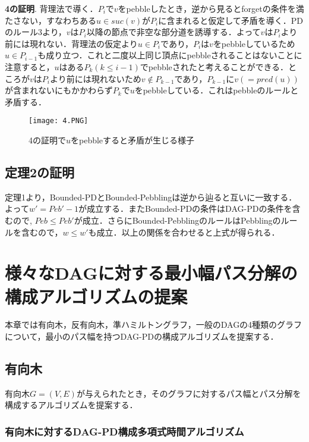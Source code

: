 \documentclass{kuisthesis}           %
\begin{document}
 \textbf{4の証明}.
 背理法で導く．$P_i$で$v$をpebbleしたとき，逆から見るとforgetの条件を満たさない，すなわちある$u \in suc(v)$が$P_i$に含まれると仮定して矛盾を導く．PDのルール3より，$v$は$P_i$以降の節点で非空な部分道を誘導する．よって$v$は$P_i$より前には現れない．背理法の仮定より$u \in P_i$であり，$P_i$は$v$をpebbleしているため$u \in P_{i-1}$も成り立つ．これと二度以上同じ頂点にpebbleされることはないことに注意すると，$u$はある$P_k (k \leq i-1)$でpebbleされたと考えることができる．ところが$v$は$P_i$より前には現れないため$v \notin P_{k-1}$であり，$P_{k-1}$に$v (= pred(u))$が含まれないにもかかわらず$P_k$で$u$をpebbleしている．これはpebbleのルールと矛盾する．

 
 \begin{figure}[tbh]
 \centering
 \texttt{[image: 4.PNG]}
 \caption{4の証明で$u$をpebbleすると矛盾が生じる様子}
 \label{fig:4}
 \end{figure}


 

 \subsection{定理2の証明}
 
 定理1より，Bounded-PDとBounded-Pebblingは逆から辿ると互いに一致する．よって$w'=Peb'-1$が成立する．またBounded-PDの条件はDAG-PDの条件を含むので, $Peb \leq Peb'$が成立．さらにBounded-PebblingのルールはPebblingのルールを含むので，$w \leq w'$も成立．以上の関係を合わせると上式が得られる．
 





\section{様々なDAGに対する最小幅パス分解の構成アルゴリズムの提案}\label{sec:advice}
本章では有向木，反有向木，準ハミルトングラフ，一般のDAGの4種類のグラフについて，最小のパス幅を持つDAG-PDの構成アルゴリズムを提案する．

 \subsection{有向木}
 有向木$G=(V, E)$が与えられたとき，そのグラフに対するパス幅とパス分解を構成するアルゴリズムを提案する．
 
 \subsubsection{有向木に対するDAG-PD構成多項式時間アルゴリズム}
\end{document}
